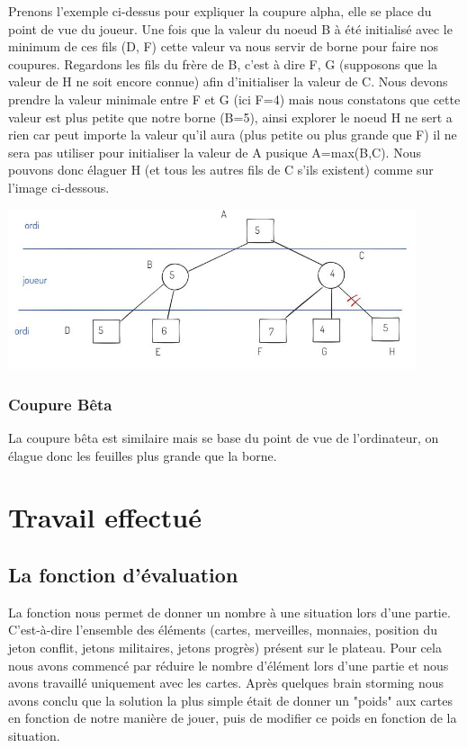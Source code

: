 \documentclass[a4paper, 12pt, french]{article}
\begin{document}
	Prenons l'exemple ci-dessus pour expliquer la coupure alpha, elle se place du point de vue du joueur.
	Une fois que la valeur du noeud B à été initialisé avec le minimum de ces fils (D, F) cette valeur va nous
	servir de borne pour faire nos coupures. Regardons les fils du frère de B, c'est à dire F, G (supposons que
	la valeur de H ne soit encore connue) afin d'initialiser la valeur de C. Nous devons prendre la valeur minimale
	entre F et G (ici F=4) mais nous constatons que cette valeur est plus petite que notre borne (B=5), ainsi explorer
	le noeud H ne sert a rien car peut importe la valeur qu'il aura (plus petite ou plus grande que F) il ne sera pas
	utiliser pour initialiser la valeur de A pusique A=max(B,C). Nous pouvons donc élaguer H (et tous les autres fils
	de C s'ils existent) comme sur l'image ci-dessous.

	\includegraphics[width=12cm]{images/elagageAlphaSuite.JPG}

	\subsubsection{Coupure Bêta}
	La coupure bêta est similaire mais se base du point de vue de l'ordinateur, on élague donc les
	feuilles plus grande que la borne.

	\section{Travail effectué}
	\subsection{La fonction d'évaluation}
		La fonction nous permet de donner un nombre à une situation lors d'une partie. C'est-à-dire l'ensemble
		des éléments (cartes, merveilles, monnaies, position du jeton conflit, jetons militaires, jetons progrès)
		présent sur le plateau. Pour cela nous avons commencé par réduire le nombre d'élément lors d'une partie et
		nous avons travaillé uniquement avec les cartes. Après quelques brain storming nous avons conclu que la solution
		la plus simple était de donner un "poids" aux cartes en fonction de notre manière de jouer, puis de modifier
		ce poids en fonction de la situation.
\end{document}
